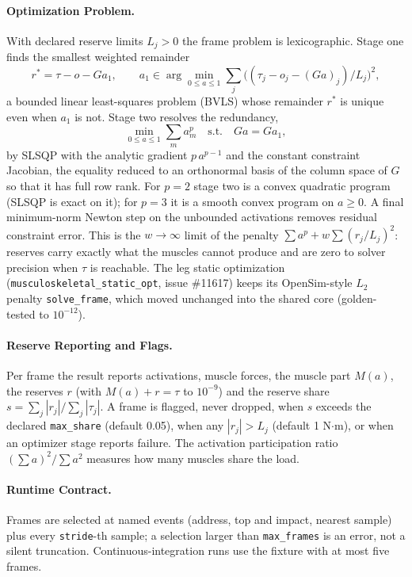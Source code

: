 \paragraph{Optimization Problem.}
With declared reserve limits $L_j>0$ the frame problem is lexicographic. Stage
one finds the smallest weighted remainder
\[
  r^\ast = \tau - o - G a_1, \qquad
  a_1 \in \arg\min_{0\le a\le 1} \sum_j \bigl((\tau_j - o_j - (Ga)_j)/L_j\bigr)^2 ,
\]
a bounded linear least-squares problem (BVLS) whose remainder $r^\ast$ is
unique even when $a_1$ is not. Stage two resolves the redundancy,
\[
  \min_{0\le a\le 1} \sum_m a_m^p \quad \text{s.t.}\quad G a = G a_1 ,
\]
by SLSQP with the analytic gradient $p\,a^{p-1}$ and the constant constraint
Jacobian, the equality reduced to an orthonormal basis of the column space of
$G$ so that it has full row rank. For $p=2$ stage two is a convex quadratic
program (SLSQP is exact on it); for $p=3$ it is a smooth convex program on
$a\ge0$. A final minimum-norm Newton step on the unbounded activations removes
residual constraint error. This is the $w\to\infty$ limit of the penalty
$\sum a^p + w\sum (r_j/L_j)^2$: reserves carry exactly what the muscles cannot
produce and are zero to solver precision when $\tau$ is reachable. The leg
static optimization (\texttt{musculoskeletal\_static\_opt}, issue \#11617)
keeps its OpenSim-style $L_2$ penalty \texttt{solve\_frame}, which moved
unchanged into the shared core (golden-tested to $10^{-12}$).

\paragraph{Reserve Reporting and Flags.}
Per frame the result reports activations, muscle forces, the muscle part
$M(a)$, the reserves $r$ (with $M(a)+r=\tau$ to $10^{-9}$) and the reserve
share $s = \sum_j |r_j| / \sum_j |\tau_j|$. A frame is flagged, never dropped,
when $s$ exceeds the declared \texttt{max\_share} (default 0.05), when any
$|r_j|>L_j$ (default 1 N$\cdot$m), or when an optimizer stage reports failure.
The activation participation ratio $(\sum a)^2/\sum a^2$ measures how many
muscles share the load.

\paragraph{Runtime Contract.}
Frames are selected at named events (address, top and impact, nearest sample)
plus every \texttt{stride}-th sample; a selection larger than
\texttt{max\_frames} is an error, not a silent truncation. Continuous-integration
runs use the fixture with at most five frames.

